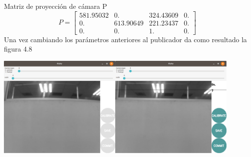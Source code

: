 Matriz de proyección de cámara P
\begin{equation}
	P=
	\begin{bmatrix}
		581.95032 & 0.        & 324.43609 & 0. \\
		0.        & 613.90649 & 221.23437 & 0. \\
		0.        & 0.        & 1.        & 0.
	\end{bmatrix}
\end{equation}
Una vez cambiando los parámetros anteriores al publicador da como resultado la figura 4.8
\begin{center}
	\includegraphics[width=0.9\textwidth]{Contenido/Cuerpo/Capitulo4/Fig10.eps}
	\label{Fig1}
\end{center}



